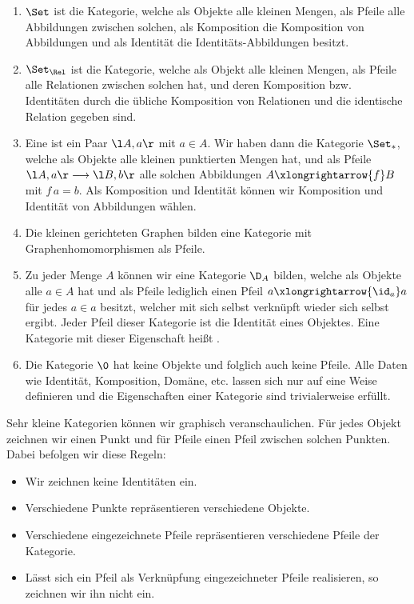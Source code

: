\begin{bsp}
\begin{enumerate}
\item $\Set$ ist die Kategorie, welche als Objekte alle kleinen Mengen, als Pfeile alle Abbildungen zwischen solchen, als Komposition die Komposition von Abbildungen und als Identität die Identitäts-Abbildungen besitzt.
\item $\Set_\Rel$ ist die Kategorie, welche als Objekt alle kleinen Mengen, als Pfeile alle Relationen zwischen solchen hat, und deren Komposition bzw. Identitäten durch die übliche Komposition von Relationen und die identische Relation gegeben sind.
\item Eine  ist ein Paar $\l A,a\r$ mit $a\in A$. Wir haben dann die Kategorie $\Set_\ast$, welche als Objekte alle kleinen punktierten Mengen hat, und als Pfeile $\l A,a\r\longrightarrow\l B,b\r$ alle solchen Abbildungen $A\xlongrightarrow{f}B$ mit $f\, a=b$. Als Komposition und Identität können wir Komposition und Identität von Abbildungen wählen.
\item Die kleinen gerichteten Graphen bilden eine Kategorie  mit Graphenhomomorphismen als Pfeile.
\item Zu jeder Menge $A$ können wir eine Kategorie $\D_A$ bilden, welche als Objekte alle $a\in A$ hat und als Pfeile lediglich einen Pfeil $a\xlongrightarrow{\id_a}a$ für jedes $a\in a$ besitzt, welcher mit sich selbst verknüpft wieder sich selbst ergibt. Jeder Pfeil dieser Kategorie ist die Identität eines Objektes. Eine Kategorie mit dieser Eigenschaft heißt .
\item Die Kategorie $\0$ hat keine Objekte und folglich auch keine Pfeile. Alle Daten wie Identität, Komposition, Domäne, etc. lassen sich nur auf eine Weise definieren und die Eigenschaften einer Kategorie sind trivialerweise erfüllt.
\end{enumerate}
\end{bsp}

Sehr kleine Kategorien können wir graphisch veranschaulichen. Für jedes Objekt zeichnen wir einen Punkt und für Pfeile einen Pfeil zwischen solchen Punkten. Dabei befolgen wir diese Regeln:
\begin{itemize}
\item Wir zeichnen keine Identitäten ein.
\item Verschiedene Punkte repräsentieren verschiedene Objekte.
\item Verschiedene eingezeichnete Pfeile repräsentieren verschiedene Pfeile der Kategorie.
\item Lässt sich ein Pfeil als Verknüpfung eingezeichneter Pfeile realisieren, so zeichnen wir ihn nicht ein.
\end{itemize}

